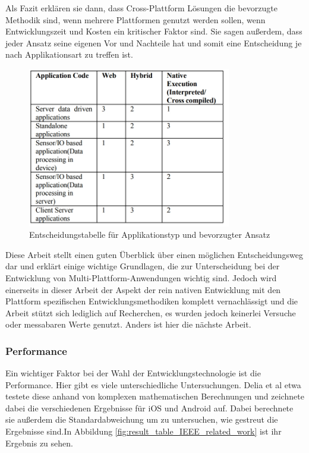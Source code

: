 Als Fazit erklären sie dann, dass Cross-Plattform Lösungen die bevorzugte Methodik sind, wenn mehrere Plattformen genutzt werden sollen, wenn Entwicklungszeit und Kosten ein kritischer Faktor sind. Sie sagen außerdem, dass jeder Ansatz seine eigenen Vor und Nachteile hat und somit eine Entscheidung je nach Applikationsart zu treffen ist. \cite{IEEE_Rahul_Seshu}
\begin{figure}[ht]
  \centering
  \includegraphics[height=7cm,keepaspectratio]{images/IEEE_related_chapter.jpg} 
  \caption{Entscheidungstabelle für Applikationstyp und bevorzugter Ansatz \cite{IEEE_Rahul_Seshu}}
  \label{fig:decision_table_IEEE_related_work}
\end{figure}

Diese Arbeit stellt einen guten Überblick über einen möglichen Entscheidungsweg dar und erklärt einige wichtige Grundlagen, die zur Unterscheidung bei der Entwicklung von Multi-Plattform-Anwendungen wichtig sind. Jedoch wird einerseits in dieser Arbeit der Aspekt der rein nativen Entwicklung mit den Plattform spezifischen Entwicklungsmethodiken komplett vernachlässigt und die Arbeit stützt sich lediglich auf Recherchen, es wurden jedoch keinerlei Versuche oder messabaren Werte genutzt. Anders ist hier die nächste Arbeit.


\subsubsection{Performance}
Ein wichtiger Faktor bei der Wahl der Entwicklungstechnologie ist die Performance. Hier gibt es viele unterschiedliche Untersuchungen. Delia et al \cite{IEEE_development_classes} etwa testete diese anhand von komplexen mathematischen Berechnungen und zeichnete dabei die verschiedenen Ergebnisse für iOS und Android auf. Dabei berechnete sie außerdem die Standardabweichung um zu untersuchen, wie gestreut die Ergebnisse sind.In Abbildung \ref{fig:result_table_IEEE_related_work} ist ihr Ergebnis zu sehen. 

